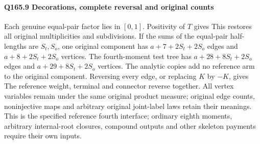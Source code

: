 \paragraph{Q165.9 Decorations, complete reversal and original counts}\label{part:Q165.9}
Each genuine equal-pair factor lies in $[0,\allowbreak 1]$. Positivity of $T$ gives
This restores all original multiplicities and subdivisions.
If the sums of the equal-pair half-lengths are $S_t,\allowbreak S_o$, one original
component has $a+7+2S_t+2S_o$ edges and $a+8+2S_t+2S_o$ vertices.
The fourth-moment test tree has $a+28+8S_t+2S_o$ edges and
$a+29+8S_t+2S_o$ vertices. The analytic copies add no reference arm
to the original component.
Reversing every edge, or replacing $K$ by $-K$, gives
The reference weight, terminal and connector reverse together.
All vertex variables remain under the same original product measure;
original edge counts, noninjective maps and arbitrary original joint-label
laws retain their meanings. This is the specified reference fourth
interface; ordinary eighth moments, arbitrary internal-root closures,
compound outputs and other skeleton payments require their own inputs.

